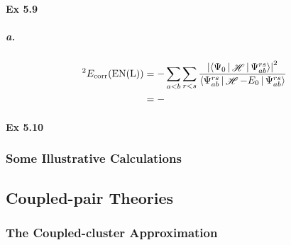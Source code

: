 \documentclass[a4paper]{article}
\DeclareMathOperator{\sH}{\mathscr{H}}
\DeclareMathOperator{\corr}{\mathrm{corr}}
\newcommand{\ex}[1]{\paragraph{Ex #1}}
\newcommand{\subex}[1]{\subparagraph{#1}}
\numberwithin{equation}{subsection}
\begin{document}
\ex{5.9}
\subex{a.}
\begin{align}
^2 E_{\corr}(\text{EN(L)}) &= -\sum_{a<b} \sum_{r<s} \dfrac{\abs{\Braket{\Psi_0|\sH|\Psi_{ab}^{rs}}}^2}{\Braket{\Psi_{ab}^{rs} | \sH - E_0 | \Psi_{ab}^{rs}}} \notag\\
&= -
\end{align}

\ex{5.10}

\subsubsection{Some Illustrative Calculations}

\subsection{Coupled-pair Theories}
\subsubsection{The Coupled-cluster Approximation}
\end{document}
